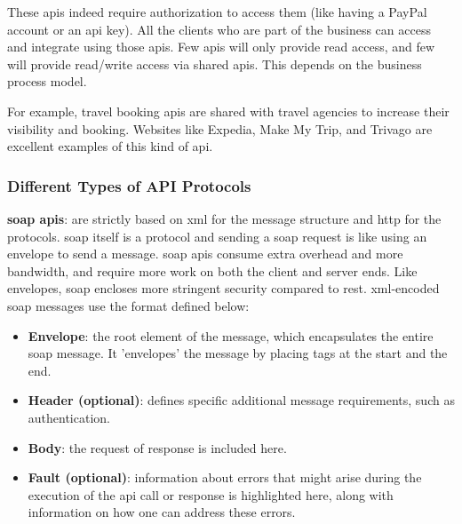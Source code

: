 \begin{multicols}{2}
      These \acrshort{api}s indeed require authorization to access them (like having a PayPal account or an \acrshort{api}
      key). All the clients who are part of the business can access and integrate using those \acrshort{api}s. Few
      \acrshort{api}s will only provide read access, and few will provide read/write access via shared \acrshort{api}s.
      This depends on the business process model.

      For example, travel booking \acrshort{api}s are shared with travel agencies to increase their visibility and
      booking. Websites like Expedia, Make My Trip, and Trivago are excellent examples of this kind of \acrshort{api}.

      \subsubsection{Different Types of API Protocols}\label{chap:typesofapis}
      \textbf{\acrshort{soap} \acrshort{api}s}: are strictly based on \acrshort{xml} for the message structure and
      \acrshort{http} for the protocols. \acrshort{soap} itself is a protocol and sending a \acrshort{soap}
      request is like using an envelope to send a message. \acrshort{soap} \acrshort{api}s consume extra
      overhead and more bandwidth, and require more work on both the client and server ends. Like envelopes,
      \acrshort{soap} encloses more stringent security compared to \acrshort{rest}. \acrshort{xml}-encoded
      \acrshort{soap} messages use the format defined below:
      \begin{itemize}
            \item \textbf{Envelope}: the root element of the message, which encapsulates the entire
                  \acrshort{soap} message. It 'envelopes' the message by placing tags at the start and the end.
            \item \textbf{Header (optional)}: defines specific additional message requirements, such as authentication.
            \item \textbf{Body}: the request of response is included here.
            \item \textbf{Fault (optional)}: information about errors that might arise during the execution of the
                  \acrshort{api} call or response is highlighted here, along with information on how one can address
                  these errors.
      \end{itemize}
\end{multicols}

